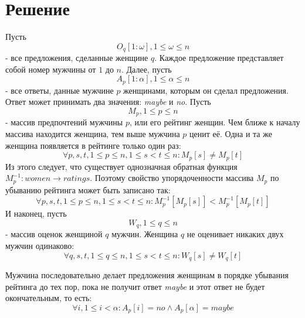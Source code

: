 \documentclass{article}
\author{Виталий Кирсанов}
\begin{document}
\small

\section{Решение}

Пусть 
\begin{displaymath}
O_q[1:\omega], 1 \leq \omega \leq n 
\end{displaymath}
- все предложения, сделанные женщине \( q \). Каждое предложение представляет собой номер мужчины от \( 1 \) до \( n \). Далее, пусть
\begin{displaymath}
A_p[1:\alpha], 1 \leq \alpha \leq n 
\end{displaymath}
- все ответы, данные мужчине \( p \) женщинами, которым он сделал предложения. Ответ может принимать два значения: \emph{maybe} и \emph{no}.
Пусть
\begin{displaymath}
M_p, 1 \leq p \leq n
\end{displaymath}
- массив предпочтений мужчины \( p \), или его рейтинг женщин. Чем ближе к началу массива находится женщина, тем выше мужчина \( p \) ценит её. Одна
и та же женщина появляется в рейтинге только один раз:
\begin{displaymath}
\forall p,s,t, 1 \leq p \leq n, 1 \leq s < t \leq n : M_p[s] \neq M_p[t]
\end{displaymath}
Из этого следует, что существует однозначная обратная функция \( M_p^{-1} : women \to ratings \). Поэтому свойство упорядоченности массива \( M_p \) по
убыванию рейтинга может быть записано так:
\begin{displaymath}
\forall p,s,t, 1 \leq p \leq n, 1 \leq s < t \leq n : M_p^{-1}[M_p[s]] < M_p^{-1}[M_p[t]]
\end{displaymath}
И наконец, пусть
\begin{displaymath}
W_q, 1 \leq q \leq n
\end{displaymath}
- массив оценок женщиной \( q \) мужчин. Женщина \( q \) не оценивает никаких двух мужчин одинаково:
\begin{displaymath}
\forall q,s,t, 1 \leq q \leq n, 1 \leq s < t \leq n : W_q[s] \neq W_q[t]
\end{displaymath}

Мужчина последовательно делает предложения женщинам в порядке убывания рейтинга до тех пор, пока не получит ответ \emph{maybe} и этот ответ не
будет окончательным, то есть:
\begin{displaymath}
\forall i, 1 \leq i < \alpha : A_p[i] = no \land A_p[\alpha] = maybe
\end{displaymath}
\end{document}
